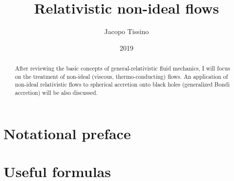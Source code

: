 \documentclass[a4paper, 11pt]{article}
\title{Relativistic non-ideal flows}
\author{Jacopo Tissino}
\date{2019}
\begin{document}


\begin{abstract}
After reviewing the basic concepts of general-relativistic fluid mechanics, I will focus on the treatment of non-ideal
(viscous, thermo-conducting) flows. An application of non-ideal relativistic flows to spherical accretion onto black holes
(generalized Bondi accretion) will be also discussed.
\end{abstract}

\section{Notational preface} \label{sec:notational-preface}



\section{Useful formulas}



\printbibliography[title={Bibliography}]

\end{document}
